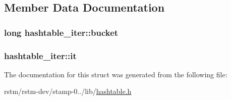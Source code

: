\subsection{Member Data Documentation}
\hypertarget{structhashtable__iter_a2c42ac7e9c6cd05149262fcadca30999}{
\subsubsection[{bucket}]{\setlength{\rightskip}{0pt plus 5cm}long hashtable\-\_\-iter\-::bucket}}\label{structhashtable__iter_a2c42ac7e9c6cd05149262fcadca30999}
\hypertarget{structhashtable__iter_a6c6a6a0cc47771f604365d9ebc1f311d}{
\subsubsection[{it}]{ hashtable\-\_\-iter\-::it}}\label{structhashtable__iter_a6c6a6a0cc47771f604365d9ebc1f311d}


The documentation for this struct was generated from the following file\-:\begin{DoxyCompactItemize}
\item 
rstm/rstm-\/dev/stamp-\/0../lib/\hyperlink{hashtable_8h}{hashtable.\-h}\end{DoxyCompactItemize}

